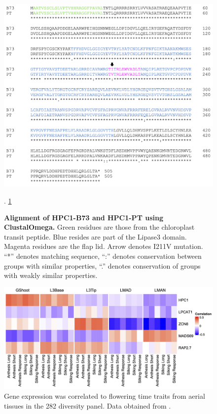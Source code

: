 \documentclass[9pt,twocolumn,twoside,lineno]{biorxiv}
\begin{document}
\clearpage
\clearpage
\begin{figure}[t]
\begin{center}
\includegraphics[width=0.8 \paperwidth]{Sup_Figures/Sup_Fig_10.png}
\caption{\textbf{Alignment of HPC1-B73 and HPC1-PT using ClustalOmega.}
Green residues are those from the chloroplast transit peptide. Blue resides are part of the Lipase3 domain. 
Magenta residues are the flap lid. 
Arrow denotes I211V mutation. “*” denotes matching sequence, “:” denotes conservation between groups with similar properties, “.” denotes conservation of groups with weakly similar properties.}.
\label{figure:Sup:aa_alilnment}
\cref{figure:Sup:aa_alilnment}
\end{center}
\end{figure} 

\clearpage

\begin{figure}[t]
\begin{center}
\includegraphics[width=0.8 \paperwidth]{Sup_Figures/Sup_Fig_11.png}
\caption{ 
Gene expression was correlated to flowering time traits from aerial tissues in the 282 diversity panel. 
Data obtained from \cite{Kremling2018-gn}.}
\label{figure:Sup:cor_heatmap}
\end{center}
\end{figure} 
\end{document}
